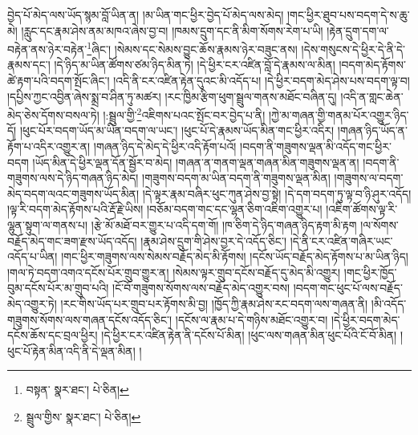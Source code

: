 བྱེད་པོ་མེད་ལས་ཡོད་སྙམ་བློ་ཡིན་ན། །མ་ཡིན་གང་ཕྱིར་བྱེད་པོ་མེད་ལས་མེད། །གང་ཕྱིར་ཐུབ་པས་བདག་དེ་ས་ཆུ་མེ། །རླུང་དང་རྣམ་ཤེས་ནམ་མཁའ་ཞེས་བྱ་བ། །ཁམས་དྲུག་དང་ནི་མིག་སོགས་རེག་པ་ཡི། །རྟེན་དྲུག་དག་ལ་བརྟེན་ནས་ཉེར་བརྟེན་\footnote{བསྟན་  སྣར་ཐང་།  པེ་ཅིན། }ཞིང་། །སེམས་དང་སེམས་བྱུང་ཆོས་རྣམས་ཉེར་བཟུང་ནས། །དེས་གསུངས་དེ་ཕྱིར་དེ་ནི་དེ་རྣམས་དང་། །དེ་ཉིད་མ་ཡིན་ཚོགས་ཙམ་ཉིད་མིན་ཏེ། །དེ་ཕྱིར་ངར་འཛིན་བློ་དེ་རྣམས་ལ་མིན། །བདག་མེད་རྟོགས་ཚེ་རྟག་པའི་བདག་སྤོང་ཞིང་། །འདི་ནི་ངར་འཛིན་རྟེན་དུའང་མི་འདོད་པ། །དེ་ཕྱིར་བདག་མེད་ཤེས་པས་བདག་ལྟ་བ། །དཔྱིས་ཀྱང་འབྱིན་ཞེས་སྨྲ་བ་ཤིན་ཏུ་མཚར། །རང་ཁྱིམ་རྩིག་ཕུག་སྦྲུལ་གནས་མཐོང་བཞིན་དུ། །འདི་ན་གླང་ཆེན་མེད་ཅེས་དོགས་བསལ་ཏེ། །:སྦྲུལ་གྱི་\footnote{སྦྲུལ་གྱིས་  སྣར་ཐང་།  པེ་ཅིན། }འཇིགས་པའང་སྤོང་བར་བྱེད་པ་ནི། །ཀྱེ་མ་གཞན་གྱི་གནམ་པོར་འགྱུར་ཉིད་དོ། །ཕུང་པོར་བདག་ཡོད་མ་ཡིན་བདག་ལ་ཡང་། །ཕུང་པོ་དེ་རྣམས་ཡོད་མིན་གང་ཕྱིར་འདིར། །གཞན་ཉིད་ཡོད་ན་རྟོག་པ་འདིར་འགྱུར་ན། །གཞན་ཉིད་དེ་མེད་དེ་ཕྱིར་འདི་རྟོག་པའོ། །བདག་ནི་གཟུགས་ལྡན་མི་འདོད་གང་ཕྱིར་བདག །ཡོད་མིན་དེ་ཕྱིར་ལྡན་དོན་སྦྱོར་བ་མེད། །གཞན་ན་གནག་ལྡན་གཞན་མིན་གཟུགས་ལྡན་ན། །བདག་ནི་གཟུགས་ལས་དེ་ཉིད་གཞན་ཉིད་མེད། །གཟུགས་བདག་མ་ཡིན་བདག་ནི་གཟུགས་ལྡན་མིན། །གཟུགས་ལ་བདག་མེད་བདག་ལའང་གཟུགས་ཡོད་མིན། །དེ་ལྟར་རྣམ་བཞིར་ཕུང་ཀུན་ཤེས་བྱ་སྟེ། །དེ་དག་བདག་ཏུ་ལྟ་བ་ཉི་ཤུར་འདོད། །ལྟ་རི་བདག་མེད་རྟོགས་པའི་རྡོ་རྗེ་ཡིས། །བཅོམ་བདག་གང་དང་ལྷན་ཅིག་འཇིག་འགྱུར་པ། །འཇིག་ཚོགས་ལྟ་རི་ལྷུན་སྟུག་ལ་གནས་པ། །རྩེ་མོ་མཐོ་བར་གྱུར་པ་འདི་དག་གོ། །ཁ་ཅིག་དེ་ཉིད་གཞན་ཉིད་རྟག་མི་རྟག །ལ་སོགས་བརྗོད་མེད་གང་ཟག་རྫས་ཡོད་འདོད། །རྣམ་ཤེས་དྲུག་གི་ཤེས་བྱར་དེ་འདོད་ཅིང་། །དེ་ནི་ངར་འཛིན་གཞིར་ཡང་འདོད་པ་ཡིན། །གང་ཕྱིར་གཟུགས་ལས་སེམས་བརྗོད་མེད་མི་རྟོགས། །དངོས་ཡོད་བརྗོད་མེད་རྟོགས་པ་མ་ཡིན་ཉིད། །གལ་ཏེ་བདག་འགའ་དངོས་པོར་གྲུབ་གྱུར་ན། །སེམས་ལྟར་གྲུབ་དངོས་བརྗོད་དུ་མེད་མི་འགྱུར། །གང་ཕྱིར་ཁྱོད་བུམ་དངོས་པོར་མ་གྲུབ་པའི། །ངོ་བོ་གཟུགས་སོགས་ལས་བརྗོད་མེད་འགྱུར་བས། །བདག་གང་ཕུང་པོ་ལས་བརྗོད་མེད་འགྱུར་ཏེ། །རང་གིས་ཡོད་པར་གྲུབ་པར་རྟོགས་མི་བྱ། །ཁྱོད་ཀྱི་རྣམ་ཤེས་རང་བདག་ལས་གཞན་ནི། །མི་འདོད་གཟུགས་སོགས་ལས་གཞན་དངོས་འདོད་ཅིང་། །དངོས་ལ་རྣམ་པ་དེ་གཉིས་མཐོང་འགྱུར་བ། །དེ་ཕྱིར་བདག་མེད་དངོས་ཆོས་དང་བྲལ་ཕྱིར། །དེ་ཕྱིར་ངར་འཛིན་རྟེན་ནི་དངོས་པོ་མིན། །ཕུང་ལས་གཞན་མིན་ཕུང་པོའི་ངོ་བོ་མིན། །ཕུང་པོ་རྟེན་མིན་འདི་ནི་དེ་ལྡན་མིན། །
